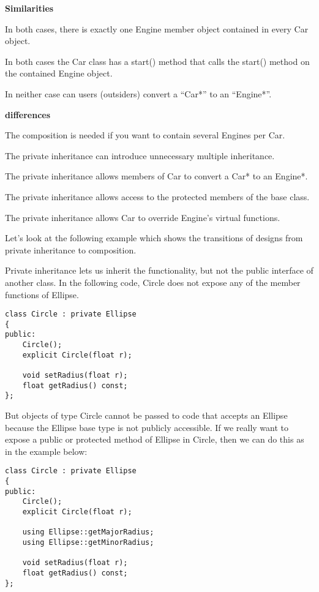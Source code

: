 \documentclass{book}
\begin{document}
\textbf{    Similarities}

        In both cases, there is exactly one Engine member object contained in every Car object.

        In both cases the Car class has a start() method that calls the start() method on the contained Engine object.

        In neither case can users (outsiders) convert a ``Car*'' to an ``Engine*''.

    \textbf{differences}

        The composition is needed if you want to contain several Engines per Car.

        The private inheritance can introduce unnecessary multiple inheritance.

        The private inheritance allows members of Car to convert a Car* to an Engine*.

        The private inheritance allows access to the protected members of the base class.

        The private inheritance allows Car to override Engine's virtual functions.

Let's look at the following example which shows the transitions of designs from private inheritance to composition.

Private inheritance lets us inherit the functionality, but not the public interface of another class. In the following code, Circle does not expose any of the member functions of Ellipse.

\begin{lstlisting}
class Circle : private Ellipse
{
public:
	Circle();
	explicit Circle(float r);

	void setRadius(float r);
	float getRadius() const;
};
\end{lstlisting}

But objects of type Circle cannot be passed to code that accepts an Ellipse because the Ellipse base type is not publicly accessible.
If we really want to expose a public or protected method of Ellipse in Circle, then we can do this as in the example below:

\begin{lstlisting}
class Circle : private Ellipse
{
public:
	Circle();
	explicit Circle(float r);

	using Ellipse::getMajorRadius;
	using Ellipse::getMinorRadius;

	void setRadius(float r);
	float getRadius() const;
};
\end{lstlisting}
\end{document}
